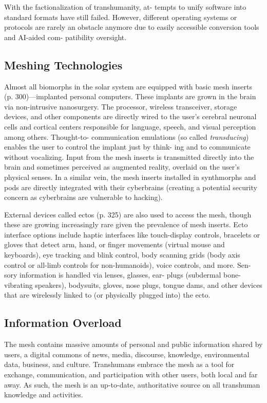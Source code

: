 With the factionalization of transhumanity, at-
tempts to unify software into standard formats have 
still failed. However, different operating systems 
or protocols are rarely an obstacle anymore due to 
easily accessible conversion tools and AI-aided com-
patibility oversight.

\subsection{Meshing Technologies}

Almost all biomorphs in the solar system are equipped 
with basic mesh inserts (p. 300)—implanted personal 
computers. These implants are grown in the brain via 
non-intrusive nanosurgery. The processor, wireless 
transceiver, storage devices, and other components 
are directly wired to the user's cerebral neuronal cells 
and cortical centers responsible for language, speech, 
and visual perception among others. Thought-to-
communication emulations (so called \textit{transducing}) 
enables the user to control the implant just by think-
ing and to communicate without vocalizing. Input 
from the mesh inserts is transmitted directly into the 
brain and sometimes perceived as augmented reality, 
overlaid on the user's physical senses. In a similar 
vein, the mesh inserts installed in synthmorphs and 
pods are directly integrated with their cyberbrains 
(creating a potential security concern as cyberbrains 
are vulnerable to hacking).

External devices called ectos (p. 325) are also 
used to access the mesh, though these are growing 
increasingly rare given the prevalence of mesh inserts. 
Ecto interface options include haptic interfaces like 
touch-display controls, bracelets or gloves that detect 
arm, hand, or finger movements (virtual mouse and 
keyboards), eye tracking and blink control, body 
scanning grids (body axis control or all-limb controls 
for non-humanoids), voice controls, and more. Sen-
sory information is handled via lenses, glasses, ear-
plugs (subdermal bone-vibrating speakers), bodysuits, 
gloves, nose plugs, tongue dams, and other devices 
that are wirelessly linked to (or physically plugged 
into) the ecto.

\subsection{Information Overload}

The mesh contains massive amounts of personal and 
public information shared by users, a digital commons 
of news, media, discourse, knowledge, environmental 
data, business, and culture. Transhumans embrace 
the mesh as a tool for exchange, communication, 
and participation with other users, both local and far 
away. As such, the mesh is an up-to-date, authoritative 
source on all transhuman knowledge and activities.

